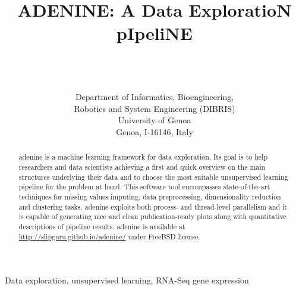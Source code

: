 \documentclass[twoside,11pt]{article}
\makeatletter
\newcommand{\ade}{{\sc adenine}\@\xspace}
\makeatother
\begin{document}
\title{{\sc ADENINE: A Data ExploratioN pIpeliNE}}

\author{ \\
 \\
 \\[1em]
\addr Department of Informatics, Bioengineering, \\Robotics and System Engineering (DIBRIS)\\
     University of Genoa\\
     Genoa, I-16146, Italy}



\maketitle

\begin{abstract}

\ade is a machine learning framework for data exploration. 
Its goal is to help researchers and data scientists achieving a first and quick overview on the main structures underlying their data and to choose the most suitable unsupervised learning pipeline for the problem at hand.
This software tool encompasses state-of-the-art techniques for missing values imputing, data preprocessing, dimensionality reduction and clustering tasks.
\ade exploits both process- and thread-level parallelism and it is capable of generating nice and clean publication-ready plots along with quantitative descriptions of pipeline results. \ade is available at \mbox{\url{http://slipguru.github.io/adenine/}} under FreeBSD license.

\end{abstract}

\begin{keywords}
Data exploration, unsupervised learning, RNA-Seq gene expression
\end{keywords}
\end{document}
